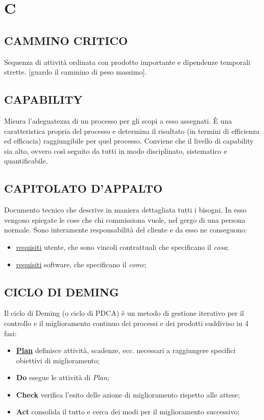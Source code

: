 \newpage
	\section{C} \label{sec:C}
	
		\subsection{CAMMINO CRITICO}  \label{camminocritico}
		Sequenza di attività ordinata con prodotto importante e dipendenze temporali strette. [guardo il cammino di peso massimo].
		
		\subsection{CAPABILITY}	 \label{capability} %
		Misura l’adeguatezza di un processo per gli scopi a esso assegnati. È una caratteristica propria del processo e  determina il risultato (in termini di efficienza ed efficacia) raggiungibile per quel processo. Conviene che il livello di capability sia alto, ovvero così seguito da tutti in modo disciplinato, sistematico e quantificabile.
		
		\subsection{CAPITOLATO D'APPALTO}  \label{capitolati}
		Documento tecnico che descrive in maniera dettagliata tutti i bisogni. In esso vengono spiegate le cose che chi commissiona vuole, nel gergo di una persona normale. Sono interamente responsabilità del cliente e da esso ne conseguono:
			\begin{itemize}
				\item \underline{\hyperref[requirements]{requisiti}} utente, che sono vincoli contrattuali che specificano il \textit{cosa};
				\item \underline{\hyperref[requirements]{requisiti}} software, che specificano il \textit{come};
			\end{itemize} 
		
		\subsection{CICLO DI DEMING}  \label{pdca}
		Il ciclo di Deming (o ciclo di PDCA) è un metodo di gestione iterativo per il controllo e il miglioramento continuo dei processi e dei prodotti suddiviso in 4 fasi:
			\begin{itemize}
				\item \textbf{\underline{\hyperref[pianificazione]{Plan}}} definisce attività, scadenze, ecc. necessari a raggiungere specifici obiettivi di miglioramento;
				\item \textbf{Do} esegue le attività di \textit{Plan};
				\item \textbf{Check} verifica l'esito delle azione di miglioramento rispetto alle attese;
				\item \textbf{Act} consolida il tutto e cerca dei modi per il miglioramento successivo; 
			\end{itemize}
		
